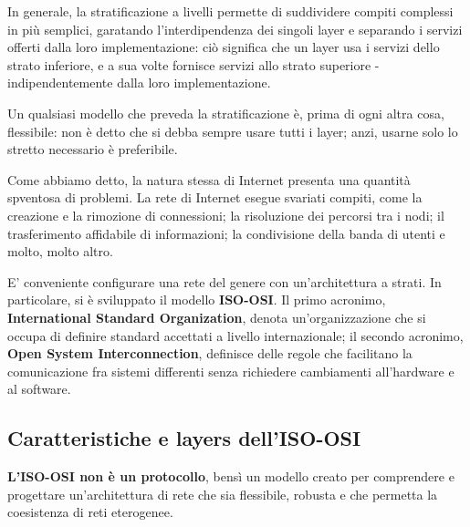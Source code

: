     \vspace{3mm}
    
    In generale, la stratificazione a livelli permette di suddividere compiti complessi in più semplici, garatando l'interdipendenza dei singoli layer e separando i servizi offerti dalla loro implementazione: ciò significa che un layer usa i servizi dello strato inferiore, e a sua volte fornisce servizi allo strato superiore - indipendentemente dalla loro implementazione.
    
    \vspace{3mm}
    
    Un qualsiasi modello che preveda la stratificazione è, prima di ogni altra cosa, flessibile: non è detto che si debba sempre usare tutti i layer; anzi, usarne solo lo stretto necessario è preferibile.
    
    \vspace{3mm}
    
    Come abbiamo detto, la natura stessa di Internet presenta una quantità spventosa di problemi. La rete di Internet esegue svariati compiti, come la creazione e la rimozione di connessioni; la risoluzione dei percorsi tra i nodi; il trasferimento affidabile di informazioni; la condivisione della banda di utenti e molto, molto altro.
    
    \vspace{3mm}
    
    E' conveniente configurare una rete del genere con un'architettura a strati. In particolare, si è sviluppato il modello \textbf{ISO-OSI}. Il primo acronimo, \textbf{International Standard Organization}, denota un'organizzazione che si occupa di definire standard accettati a livello internazionale; il secondo acronimo, \textbf{Open System Interconnection}, definisce delle regole che facilitano la comunicazione fra sistemi differenti senza richiedere cambiamenti all'hardware e al software.
    
    \subsection{Caratteristiche e layers dell'ISO-OSI}
    
        \textbf{L'ISO-OSI non è un protocollo}, bensì un modello creato per comprendere e progettare un'architettura di rete che sia flessibile, robusta e che permetta la coesistenza di reti eterogenee.
        
